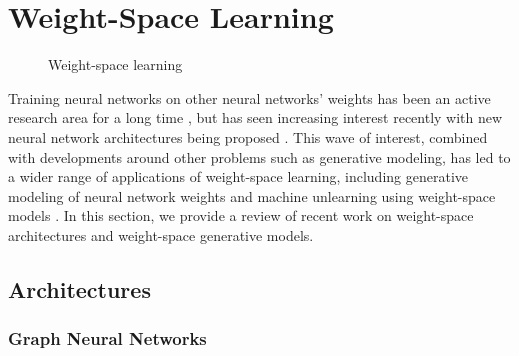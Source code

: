 
\chapter{Weight-Space Learning}\label{section:wsl}

\begin{figure}[h!]
    \caption{\label{fig:wsl} Weight-space learning}    
\end{figure}

Training neural networks on other neural networks' weights has been an active research area for a long time \citep{haHyperNetworks2016, kruegerBayesianHypernetworks2018}, but has seen increasing interest recently with new neural network architectures being proposed \citep{limGraphMetanetworksProcessing2023,kofinasGraphNeuralNetworks2024,
zhouNeuralFunctionalTransformers2023,zhouUniversalNeuralFunctionals2024}. This wave of interest, combined with developments around other problems such as generative modeling, has led to a wider range of applications of weight-space learning, including generative modeling of neural network weights \citep{peeblesLearningLearnGenerative2022, erkocHyperDiffusionGeneratingImplicit2023} and machine unlearning using weight-space models \citep{rangelLearningForgetUsing2024}. In this section, we provide a review of recent work on weight-space architectures and weight-space generative models. 

\section{Architectures}



\subsection{Graph Neural Networks}


